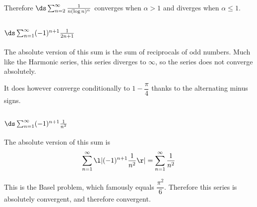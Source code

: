\documentclass[a4paper]{article}
\begin{document}
Therefore $\ds\sum_{n=2}^\infty \frac1{n (\log n)^\alpha}$ converges when $\alpha > 1$ and diverges when $\alpha \le 1$.


\subsection{$\ds\sum_{n=1}^\infty (-1)^{n+1} \frac1{2n+1}$}

The absolute version of this sum is the sum of reciprocals of odd numbers. Much like the Harmonic series, this series diverges to $\infty$, so the series does not converge absolutely.

It does however converge conditionally to $1 - \dfrac\pi4$ thanks to the alternating minus signs.

\subsection{$\ds\sum_{n=1}^\infty (-1)^{n+1} \frac1{n^2}$}

The absolute version of this sum is $$\sum_{n=1}^\infty \l| (-1)^{n+1} \frac1{n^2} \r| = \sum_{n=1}^\infty \frac1{n^2}$$

This is the Basel problem, which famously equals $\dfrac{\pi^2}6$. Therefore this series is absolutely convergent, and therefore convergent.
\end{document}
